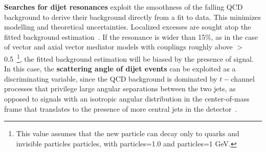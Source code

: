 \textbf{Searches for dijet resonances} exploit the smoothness of the falling QCD background
to derive their background directly from a fit to data. This minimizes modelling
and theoretical uncertainties. Localized excesses are sought atop %
the fitted background estimation~\cite{Aaboud:2017yvp,CMS-PAS-EXO-16-056}. 
If the resonance is wider than 15\%, as in the case of 
vector and axial vector mediator models with couplings roughly above \gq$>$0.5~\footnote{This value
assumes that the new particle can decay only to quarks and invisible particles particles, with \ginvisible particles=1.0 and \minvisible particles=1 GeV.}, 
the fitted background estimation will be biased by the presence of signal. 
In this case, the \textbf{scattering angle of dijet events} can be exploited as a discriminating variable, 
since the QCD background is dominated by $t-$channel processes that privilege
large angular separations between the two jets, as opposed to signals with an isotropic angular distribution
in the center-of-mass frame that translates to the presence of more central jets in the
detector~\cite{CMS-PAS-EXO-16-046,Aaboud:2017yvp}.  

